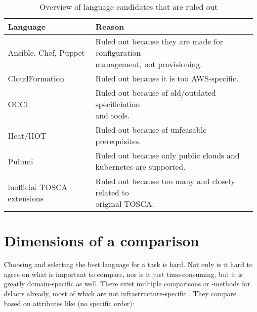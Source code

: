 \begin{table}[H]
  \caption{Overview of language candidates that are ruled out}
  \begin{tabular}{ | l | l | }
    \hline
    Language & Reason \\
    \hline \hline
    Ansible, Chef, Puppet & \makecell{Ruled out because they are made for configuration \\ management, not provisioning.} \\
    \hline
    CloudFormation & Ruled out because it is too AWS-specific. \\
    \hline
    OCCI & \makecell{Ruled out because of old/outdated specificiation \\ and tools.} \\
    \hline
    Heat/HOT & Ruled out because of unfeasable prerequisites. \\
    \hline
    Pulumi & Ruled out because only public clouds and kubernetes are supported. \\
    \hline
    inofficial TOSCA extensions & \makecell{Ruled out because too many and closely related to \\ original TOSCA.} \\
    \hline
  \end{tabular}
  \label{tab:afterculling}
\end{table}

\section{Dimensions of a comparison}
Choosing and selecting the best language for a task is hard. Not only is it hard to agree on what is important to compare, nor is it just time-consuming, but it is greatly domain-specific as well.
There exist multiple comparisons or -methods for \gls{dslacr}s already, most of which are not infrastructure-specific \cite{comparative_study_of_dsl_tools} \cite{comparing_gpl_dsl} \cite{dsl_for_iac} \cite{allgemeine_modeltheorie}.
They compare based on attributes like (no specific order):

